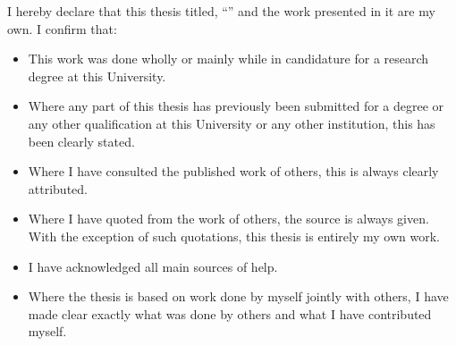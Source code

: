 \documentclass[
11pt, %
english, %
onehalfspacing, %
headsepline, %
]{MastersDoctoralThesis} %
\begin{document}
\begin{declaration}
\addchaptertocentry{\authorshipname} %
\noindent I hereby declare that this thesis titled, \enquote{\ttitle} and the work presented in it are my own. I confirm that:

\begin{itemize} 
\item This work was done wholly or mainly while in candidature for a research degree at this University.
\item Where any part of this thesis has previously been submitted for a degree or any other qualification at this University or any other institution, this has been clearly stated.
\item Where I have consulted the published work of others, this is always clearly attributed.
\item Where I have quoted from the work of others, the source is always given. With the exception of such quotations, this thesis is entirely my own work.
\item I have acknowledged all main sources of help.
\item Where the thesis is based on work done by myself jointly with others, I have made clear exactly what was done by others and what I have contributed myself.
\end{itemize}

\hspace{-1cm}




\end{declaration}
\end{document}
